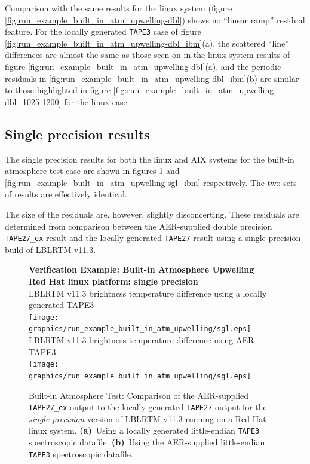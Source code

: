 Comparison with the same results for the linux system (figure \ref{fig:run_example_built_in_atm_upwelling-dbl}) shows no ``linear ramp'' residual feature. For the locally generated \texttt{TAPE3} case of figure \ref{fig:run_example_built_in_atm_upwelling-dbl_ibm}(a), the scattered ``line'' differences are almost the same as those seen on in the linux system results of figure \ref{fig:run_example_built_in_atm_upwelling-dbl}(a), and the periodic residuals in \ref{fig:run_example_built_in_atm_upwelling-dbl_ibm}(b) are similar to those highlighted in figure \ref{fig:run_example_built_in_atm_upwelling-dbl_1025-1200} for the linux case.


\subsection{Single precision results}
\label{sec:built_in_sgl}
The single precision results for both the linux and AIX systems for the built-in atmosphere test case are shown in figures \ref{fig:run_example_built_in_atm_upwelling-sgl} and \ref{fig:run_example_built_in_atm_upwelling-sgl_ibm} respectively. The two sets of results are effectively identical.

The size of the residuals are, however, slightly disconcerting. These residuals are determined from comparison between the AER-supplied double precision \texttt{TAPE27\_ex} result and the locally generated \texttt{TAPE27} result using a single precision build of LBLRTM v11.3.

\begin{figure}[htp]
  \centering
  \qquad\sffamily\textbf{Verification Example: Built-in Atmosphere Upwelling}\\
  \qquad\sffamily\textbf{Red Hat linux platform; single precision}\\
  \qquad\textsf{LBLRTM v11.3 brightness temperature difference using a locally generated TAPE3}\\
  \texttt{[image: graphics/run\_example\_built\_in\_atm\_upwelling/sgl.eps]}
  \qquad\textsf{LBLRTM v11.3 brightness temperature difference using AER TAPE3}\\
  \texttt{[image: graphics/run\_example\_built\_in\_atm\_upwelling/sgl.eps]}
  \caption{Built-in Atmosphere Test: Comparison of the AER-supplied \texttt{TAPE27\_ex} output to the locally generated \texttt{TAPE27} output for the \textsl{single precision} version of LBLRTM v11.3 running on a Red Hat linux system. \mbox{\textbf{(a)} Using} a locally generated little-endian \texttt{TAPE3} spectroscopic datafile. \mbox{\textbf{(b)} Using} the AER-supplied little-endian \texttt{TAPE3} spectroscopic datafile.}
  \label{fig:run_example_built_in_atm_upwelling-sgl}
\end{figure}

